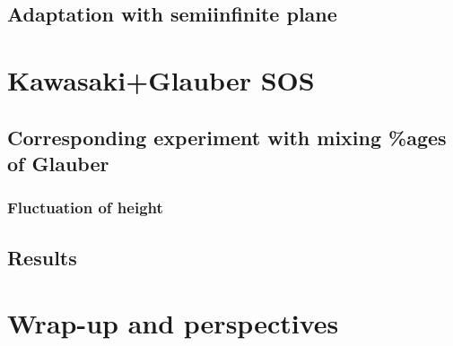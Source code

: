 \documentclass[a4paper,11pt]{report}
\begin{document}
  \section{Adaptation with semiinfinite plane}

\chapter{Kawasaki+Glauber SOS}
  \section{Corresponding experiment with mixing \%ages of Glauber}
    \subsection{Fluctuation of height}
  \section{Results}
  
\chapter{Wrap-up and perspectives}
  
\end{document}
